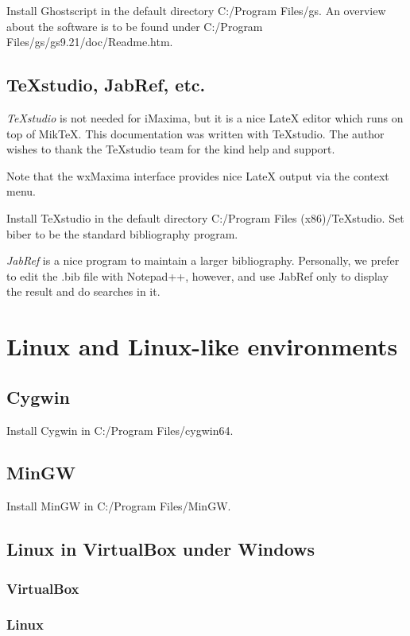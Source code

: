 \documentclass[../Maxima_Workbook.tex]{subfiles}
\begin{document}
\lz Install Ghostscript in the default directory C:/Program Files/gs. An overview about the software is to be found under C:/Program Files/gs/gs9.21/doc/Readme.htm.

\subsection{TeXstudio, JabRef, etc.}

\emph{TeXstudio} is not needed for iMaxima, but it is a nice LateX editor which runs on top of MikTeX. This documentation was written with TeXstudio. The author wishes to thank the TeXstudio team for the kind help and support.

\lz Note that the wxMaxima interface provides nice LateX output via the context menu.

\lz Install TeXstudio in the default directory C:/Program Files (x86)/TeXstudio. Set biber to be the standard bibliography program.

\lz \emph{JabRef} is a nice program to maintain a larger bibliography. Personally, we prefer to edit the .bib file with Notepad++, however, and use JabRef only to display the result and do searches in it.

\section{Linux and Linux-like environments}

\subsection{Cygwin}

Install Cygwin in C:/Program Files/cygwin64.

\subsection{MinGW}

Install MinGW in C:/Program Files/MinGW.

\subsection{Linux in VirtualBox under Windows}

\subsubsection{VirtualBox}

\subsubsection{Linux}
\end{document}
